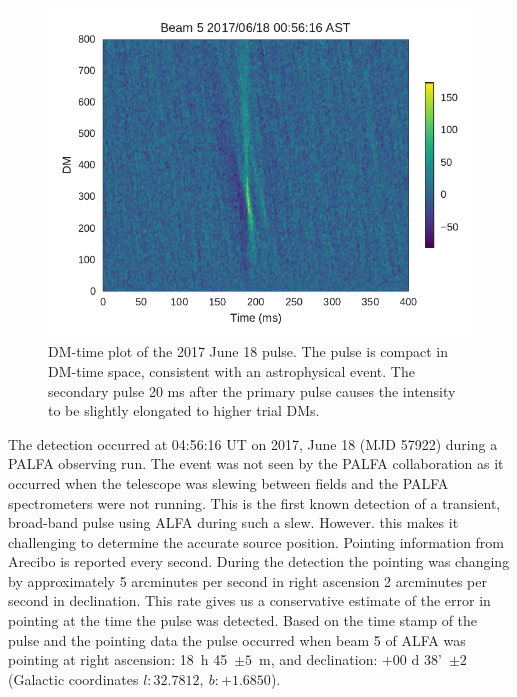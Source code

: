 \documentclass[a4paper,fleqn,usenatbib]{mnras}
\begin{document}
\begin{figure}
    \includegraphics[width=1.0\linewidth]{figures/Beam5_fb_D20170618T005616_buffer2_dmspace.pdf}
    \caption{DM-time plot of the 2017 June 18 pulse. The pulse is compact in
    DM-time space, consistent with an astrophysical event. The secondary pulse
    20 ms after the primary pulse causes the intensity to be slightly elongated
    to higher trial DMs.
    }
    \label{fig:D20170618_dmspace}
\end{figure}

The detection occurred at 04:56:16 UT on 2017, June 18 (MJD 57922) during a
PALFA observing run. The event was not seen by the PALFA collaboration as it
occurred when the telescope was slewing between fields and the PALFA
spectrometers were not running. This is the first known detection of a
transient, broad-band pulse using ALFA during such a slew. However. this makes
it challenging to determine the accurate source position. Pointing information
from Arecibo is reported every second.  During the detection the pointing was
changing by approximately 5 arcminutes per second in right ascension 2
arcminutes per second in declination. This rate gives us a conservative estimate
of the error in pointing at the time the pulse was detected. Based on the time
stamp of the pulse and the pointing data the pulse occurred when beam 5 of ALFA
was pointing at right ascension: 18~h 45~$\pm 5$~m, and declination: +00 d
38'~$\pm 2$ (Galactic coordinates $l: 32.7812, ~b: +1.6850$).
\end{document}
